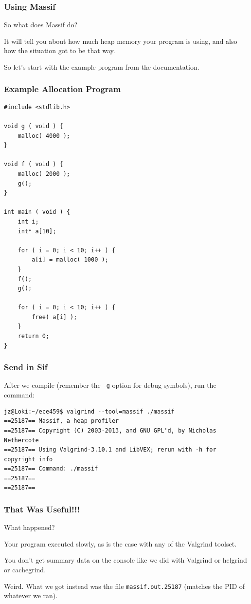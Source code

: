 \begin{frame}
\frametitle{Using Massif}

So what does Massif do? 

It will tell you about how much heap memory your program is using, and also how the situation got to be that way. 

So let's start with the example program from the documentation.

\end{frame}

\begin{frame}[fragile]
\frametitle{Example Allocation Program}

{\scriptsize
\begin{verbatim}
#include <stdlib.h>

void g ( void ) {
    malloc( 4000 );
}

void f ( void ) {
    malloc( 2000 );
    g();
}

int main ( void ) {
    int i;
    int* a[10];

    for ( i = 0; i < 10; i++ ) {
        a[i] = malloc( 1000 );
    }
    f();
    g();

    for ( i = 0; i < 10; i++ ) {
        free( a[i] );
    }
    return 0;
}
\end{verbatim}
}


\end{frame}

\begin{frame}[fragile]
\frametitle{Send in Sif}

After we compile (remember the \texttt{-g} option for debug symbols), run the command:
{\scriptsize
\begin{verbatim}
jz@Loki:~/ece459$ valgrind --tool=massif ./massif
==25187== Massif, a heap profiler
==25187== Copyright (C) 2003-2013, and GNU GPL'd, by Nicholas Nethercote
==25187== Using Valgrind-3.10.1 and LibVEX; rerun with -h for copyright info
==25187== Command: ./massif
==25187== 
==25187== 
\end{verbatim}
}

\end{frame}


\begin{frame}
\frametitle{That Was Useful!!!}

What happened? 

Your program executed slowly, as is the case with any of the Valgrind toolset. 

You don't get summary data on the console like we did with Valgrind or helgrind or cachegrind. 

Weird. What we got instead was the file \texttt{massif.out.25187} (matches the PID of whatever we ran).


\end{frame}


